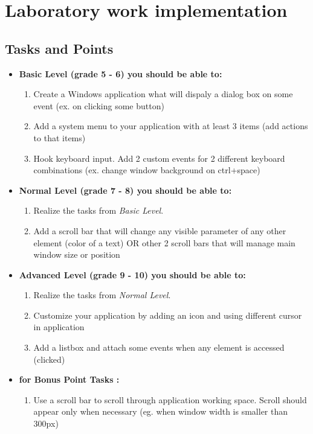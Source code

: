 \section{Laboratory work implementation}

\subsection{Tasks and Points}
\begin{itemize}
\item \textbf{Basic Level (grade 5 - 6) you should be able to:}
	\begin{enumerate}
	\item Create a Windows application what will dispaly a dialog box on some event (ex. on clicking some button)
      \item Add a system menu to your application with at least 3 items (add actions to that items)
      \item Hook keyboard input. Add 2 custom events for 2 different keyboard combinations (ex. change window background on ctrl+space)
      \end{enumerate}
\item \textbf{Normal Level (grade 7 - 8) you should be able to:}
      \begin{enumerate}
    \item Realize the tasks from \textit{Basic Level}.
    \item Add a scroll bar that will change any visible parameter of any other element (color of a text) OR other 2 scroll bars that will manage main window size or position
          \end{enumerate}
\item \textbf{Advanced Level (grade 9 - 10) you should be able to:}
      \begin{enumerate}
    \item Realize the tasks from \textit{Normal Level}.
    \item Customize your application by adding an icon and using different cursor in application
    \item Add a listbox and attach some events when any element is accessed (clicked)
          \end{enumerate}
\item \textbf{for Bonus Point Tasks :}
\begin{enumerate}
	\item Use a scroll bar to scroll through application working space. Scroll should appear only when necessary (eg. when window width is smaller than 300px)
    \end{enumerate}
  \end{itemize}  


